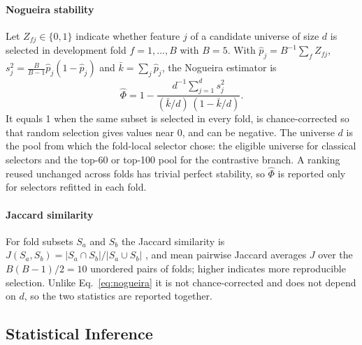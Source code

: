 \documentclass[final,5p,twocolumn]{elsarticle}
\begin{document}
\paragraph{Nogueira stability}
Let $Z_{fj}\in\{0,1\}$ indicate whether feature $j$ of a candidate universe of size $d$ is selected in development fold $f=1,\dots,B$ with $B=5$. With $\hat p_j=B^{-1}\sum_f Z_{fj}$, $s_j^2=\frac{B}{B-1}\hat p_j(1-\hat p_j)$ and $\bar k=\sum_j \hat p_j$, the Nogueira estimator is \cite{nogueira2018}
\begin{equation}
    \hat\Phi=1-\frac{d^{-1}\sum_{j=1}^{d}s_j^2}{(\bar k/d)\,(1-\bar k/d)} .
    \label{eq:nogueira}
\end{equation}
It equals 1 when the same subset is selected in every fold, is chance-corrected so that random selection gives values near 0, and can be negative. The universe $d$ is the pool from which the fold-local selector chose: the eligible universe for classical selectors and the top-60 or top-100 pool for the contrastive branch. A ranking reused unchanged across folds has trivial perfect stability, so $\hat\Phi$ is reported only for selectors refitted in each fold.

\paragraph{Jaccard similarity}
For fold subsets $S_a$ and $S_b$ the Jaccard similarity is $J(S_a,S_b)=|S_a\cap S_b|/|S_a\cup S_b|$ \cite{jaccard1901}, and mean pairwise Jaccard averages $J$ over the $B(B-1)/2=10$ unordered pairs of folds; higher indicates more reproducible selection. Unlike Eq.~\eqref{eq:nogueira} it is not chance-corrected and does not depend on $d$, so the two statistics are reported together.

\subsection{Statistical Inference}
\label{subsec:inference}
\end{document}
